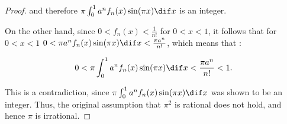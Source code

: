 \documentclass[11pt]{scrartcl}
\begin{document}
\begin{proof}
and therefore $  \pi\int_0^1a^nf_n(x)\sin(\pi x) \dif x $ is an integer.

On the other hand, since $0 < f_n(x) < \frac{1}{n!}$ for $0 < x < 1 $, it follows that for $0 < x < 1 $ $0<  \pi a^nf_n(x)\sin(\pi x) \dif x < \frac{\pi a^n}{n!}$, which means that :


\begin{equation*}
0<   \pi\int_0^1a^nf_n(x)\sin(\pi x) \dif x < \frac{\pi a^n}{n!} < 1.
\end{equation*}

This is a contradiction, since $\pi\int_0^1a^nf_n(x)\sin(\pi x) \dif x $ was shown to be an integer. Thus, the original assumption that $\pi^2$ is rational does not hold, and hence $\pi$ is irrational.

\end{proof}
\end{document}
